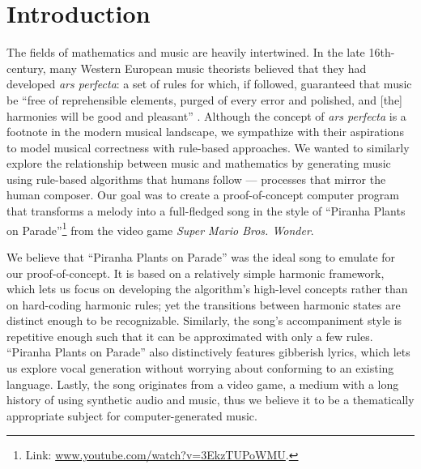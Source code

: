 \section{Introduction}

The fields of mathematics and music are heavily intertwined. In the late 16th-century, many Western European music theorists believed that they had developed \emph{ars perfecta}: a set of rules for which, if followed, guaranteed that music be ``free of reprehensible elements, purged of every error and polished, and [the] harmonies will be good and pleasant'' \autocite{Richard:2005}. Although the concept of \emph{ars perfecta} is a footnote in the modern musical landscape, we sympathize with their aspirations to model musical correctness with rule-based approaches. We wanted to similarly explore the relationship between music and mathematics by generating music using rule-based algorithms that humans follow --- processes that mirror the human composer. Our goal was to create a proof-of-concept computer program that transforms a melody into a full-fledged song in the style of ``Piranha Plants on Parade''\footnote{Link: \href{https://www.youtube.com/watch?v=3EkzTUPoWMU}{www.youtube.com/watch?v=3EkzTUPoWMU}.} from the video game \emph{Super Mario Bros. Wonder}.

We believe that ``Piranha Plants on Parade'' was the ideal song to emulate for our proof-of-concept. It is based on a relatively simple harmonic framework, which lets us focus on developing the algorithm's high-level concepts rather than on hard-coding harmonic rules; yet the transitions between harmonic states are distinct enough to be recognizable. Similarly, the song's accompaniment style is repetitive enough such that it can be approximated with only a few rules. ``Piranha Plants on Parade'' also distinctively features gibberish lyrics, which lets us explore vocal generation without worrying about conforming to an existing language. Lastly, the song originates from a video game, a medium with a long history of using synthetic audio and music, thus we believe it to be a thematically appropriate subject for computer-generated music.

